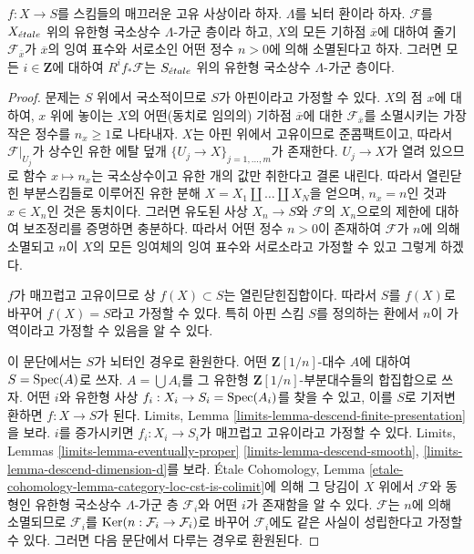 \begin{proposition}
\label{proposition-loc-cst-torsion}
$f : X \to S$를 스킴들의 매끄러운 고유 사상이라 하자.
$\Lambda$를 뇌터 환이라 하자. $\mathcal{F}$를 $X_{\acute{e}tale}$ 위의 유한형
국소상수 $\Lambda$-가군 층이라 하고, $X$의 모든 기하점
$\overline{x}$에 대하여 줄기 $\mathcal{F}_{\overline{x}}$가
$\overline{x}$의 잉여 표수와 서로소인 어떤 정수 $n > 0$에 의해
소멸된다고 하자. 그러면 모든 $i \in \mathbf{Z}$에 대하여
$R^if_*\mathcal{F}$는 $S_{\acute{e}tale}$ 위의 유한형 국소상수
$\Lambda$-가군 층이다.
\end{proposition}

\begin{proof}
문제는 $S$ 위에서 국소적이므로 $S$가 아핀이라고 가정할 수 있다.
$X$의 점 $x$에 대하여, $x$ 위에 놓이는 $X$의 어떤(동치로 임의의)
기하점 $\overline{x}$에 대한 $\mathcal{F}_{\overline{x}}$를
소멸시키는 가장 작은 정수를 $n_x \geq 1$로 나타내자.
$X$는 아핀 위에서 고유이므로 준콤팩트이고, 따라서
$\mathcal{F}|_{U_j}$가 상수인 유한 에탈 덮개
$\{U_j \to X\}_{j = 1, \ldots, m}$가 존재한다.
$U_j \to X$가 열려 있으므로 함수 $x \mapsto n_x$는 국소상수이고
유한 개의 값만 취한다고 결론 내린다. 따라서 열린닫힌 부분스킴들로
이루어진 유한 분해
$X = X_1 \amalg \ldots \amalg X_N$을 얻으며,
$n_x = n$인 것과 $x \in X_n$인 것은 동치이다.
그러면 유도된 사상 $X_n \to S$와 $\mathcal{F}$의 $X_n$으로의
제한에 대하여 보조정리를 증명하면 충분하다.
따라서 어떤 정수 $n > 0$이 존재하여 $\mathcal{F}$가 $n$에 의해
소멸되고 $n$이 $X$의 모든 잉여체의 잉여 표수와 서로소라고 가정할
수 있고 그렇게 하겠다.

\medskip\noindent
$f$가 매끄럽고 고유이므로 상 $f(X) \subset S$는 열린닫힌집합이다.
따라서 $S$를 $f(X)$로 바꾸어 $f(X) = S$라고 가정할 수 있다.
특히 아핀 스킴 $S$를 정의하는 환에서 $n$이 가역이라고 가정할 수
있음을 알 수 있다.

\medskip\noindent
이 문단에서는 $S$가 뇌터인 경우로 환원한다.
어떤 $\mathbf{Z}[1/n]$-대수 $A$에 대하여
$S = \mathop{\mathrm{Spec}}(A)$로 쓰자.
$A = \bigcup A_i$를 그 유한형 $\mathbf{Z}[1/n]$-부분대수들의
합집합으로 쓰자. 어떤 $i$와 유한형 사상
$f_i : X_i \to S_i = \mathop{\mathrm{Spec}}(A_i)$를 찾을 수 있고, 이를 $S$로
기저변환하면 $f : X \to S$가 된다. Limits, Lemma
\ref{limits-lemma-descend-finite-presentation}을 보라.
$i$를 증가시키면 $f_i : X_i \to S_i$가 매끄럽고 고유이라고
가정할 수 있다. Limits, Lemmas
\ref{limits-lemma-eventually-proper}
\ref{limits-lemma-descend-smooth},
\ref{limits-lemma-descend-dimension-d}를 보라.
\'Etale Cohomology, Lemma
\ref{etale-cohomology-lemma-category-loc-cst-is-colimit}에 의해
그 당김이 $X$ 위에서 $\mathcal{F}$와 동형인 유한형 국소상수
$\Lambda$-가군 층 $\mathcal{F}_i$와 어떤 $i$가 존재함을 알 수 있다.
$\mathcal{F}$는 $n$에 의해 소멸되므로 $\mathcal{F}_i$를
$\mathop{\mathrm{Ker}}(n : \mathcal{F}_i \to \mathcal{F}_i)$로 바꾸어
$\mathcal{F}_i$에도 같은 사실이 성립한다고 가정할 수 있다.
그러면 다음 문단에서 다루는 경우로 환원된다.


\end{proof}
